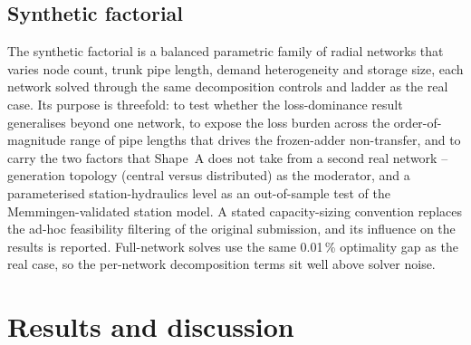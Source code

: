 \documentclass[a4paper,fleqn]{cas-dc}
\begin{document}
\subsection{Synthetic factorial}
The synthetic factorial is a balanced parametric family of radial networks that varies node
count, trunk pipe length, demand heterogeneity and storage size, each network solved through
the same decomposition controls and ladder as the real case. Its purpose is threefold: to test
whether the loss-dominance result generalises beyond one network, to expose the loss burden
across the order-of-magnitude range of pipe lengths that drives the frozen-adder
non-transfer, and to carry the two factors that Shape~A does not take from a second real
network -- generation topology (central versus distributed) as the moderator, and a
parameterised station-hydraulics level as an out-of-sample test of the Memmingen-validated
station model. A stated capacity-sizing convention replaces the ad-hoc feasibility filtering of
the original submission, and its influence on the results is reported. Full-network solves use
the same 0.01\,\% optimality gap as the real case, so the per-network decomposition terms sit
well above solver noise.


\section{Results and discussion}
\label{sec:results}
\end{document}

